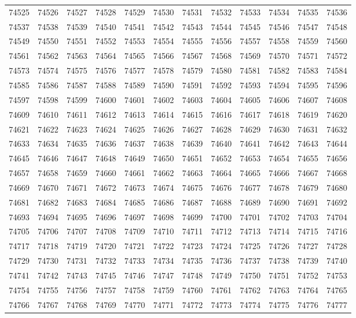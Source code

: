 \begin{center}
\begin{longtable}{llllllllllll}
74525 &74526 &74527 &74528 &74529 &74530 &74531 &74532 &74533 &74534 &74535 &74536 \\
74537 &74538 &74539 &74540 &74541 &74542 &74543 &74544 &74545 &74546 &74547 &74548 \\
74549 &74550 &74551 &74552 &74553 &74554 &74555 &74556 &74557 &74558 &74559 &74560 \\
74561 &74562 &74563 &74564 &74565 &74566 &74567 &74568 &74569 &74570 &74571 &74572 \\
74573 &74574 &74575 &74576 &74577 &74578 &74579 &74580 &74581 &74582 &74583 &74584 \\
74585 &74586 &74587 &74588 &74589 &74590 &74591 &74592 &74593 &74594 &74595 &74596 \\
74597 &74598 &74599 &74600 &74601 &74602 &74603 &74604 &74605 &74606 &74607 &74608 \\
74609 &74610 &74611 &74612 &74613 &74614 &74615 &74616 &74617 &74618 &74619 &74620 \\
74621 &74622 &74623 &74624 &74625 &74626 &74627 &74628 &74629 &74630 &74631 &74632 \\
74633 &74634 &74635 &74636 &74637 &74638 &74639 &74640 &74641 &74642 &74643 &74644 \\
74645 &74646 &74647 &74648 &74649 &74650 &74651 &74652 &74653 &74654 &74655 &74656 \\
74657 &74658 &74659 &74660 &74661 &74662 &74663 &74664 &74665 &74666 &74667 &74668 \\
74669 &74670 &74671 &74672 &74673 &74674 &74675 &74676 &74677 &74678 &74679 &74680 \\
74681 &74682 &74683 &74684 &74685 &74686 &74687 &74688 &74689 &74690 &74691 &74692 \\
74693 &74694 &74695 &74696 &74697 &74698 &74699 &74700 &74701 &74702 &74703 &74704 \\
74705 &74706 &74707 &74708 &74709 &74710 &74711 &74712 &74713 &74714 &74715 &74716 \\
74717 &74718 &74719 &74720 &74721 &74722 &74723 &74724 &74725 &74726 &74727 &74728 \\
74729 &74730 &74731 &74732 &74733 &74734 &74735 &74736 &74737 &74738 &74739 &74740 \\
74741 &74742 &74743 &74745 &74746 &74747 &74748 &74749 &74750 &74751 &74752 &74753 \\
74754 &74755 &74756 &74757 &74758 &74759 &74760 &74761 &74762 &74763 &74764 &74765 \\
74766 &74767 &74768 &74769 &74770 &74771 &74772 &74773 &74774 &74775 &74776 &74777 \\

\end{longtable}
\end{center}
